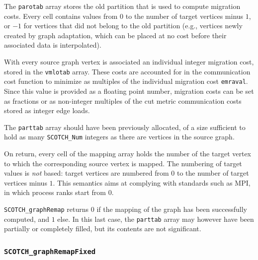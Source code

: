 \begin{itemize}
The {\tt parotab} array stores the old partition that is used to
compute migration costs. Every cell contains values from $0$ to the
number of target vertices minus $1$, or $-1$ for vertices that did not
belong to the old partition (e.g., vertices newly created by graph
adaptation, which can be placed at no cost before their associated
data is interpolated).

With every source graph vertex is associated an individual integer
migration cost, stored in the {\tt vmlotab} array. These costs are
accounted for in the communication cost function to minimize as
multiples of the individual migration cost {\tt emraval}. Since this
value is provided as a floating point number, migration costs can be
set as fractions or as non-integer multiples of the cut metric
communication costs stored as integer edge loads.

The {\tt parttab} array should have been previously allocated, of a
size sufficient to hold as many {\tt SCOTCH\_\lbt Num} integers as
there are vertices in the source graph.

On return, every cell of the mapping array holds the number of the
target vertex to which the corresponding source vertex is mapped.
The numbering of target values is {\em not\/} based: target vertices
are numbered from $0$ to the number of target vertices minus $1$.
This semantics aims at complying with standards such as MPI, in
which process ranks start from $0$.

\progret

{\tt SCOTCH\_graphRemap} returns $0$ if the mapping of the graph has
been successfully computed, and $1$ else. In this last case, the
{\tt parttab} array may however have been partially or completely
filled, but its contents are not significant.
\end{itemize}

\subsubsection{{\tt SCOTCH\_graphRemapFixed}}
\label{sec-lib-func-graphremapfixed}

